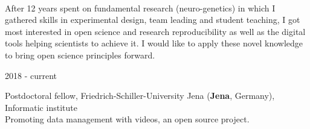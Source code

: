 \begin{minipage}[t]{\textwidth}
\begin{minipage}[b]{0.5\textwidth}
    \end{minipage}\hfill
    \begin{minipage}[b]{0.5\textwidth}
        \begin{flushright}
        \end{flushright}
    \end{minipage}
\end{minipage}\\

After 12 years spent on fundamental research (neuro-genetics) in which I gathered skills in experimental design, team leading and student teaching, I got most interested in open science and research reproducibility as well as the digital tools helping scientists to achieve it.
I would like to apply these novel knowledge %
to bring open science principles forward.

%
\parbox{0.15\textwidth}{2018 - current}\hfill
\parbox[t]{0.83\textwidth}{Postdoctoral fellow,
       Friedrich-Schiller-University Jena  (\textbf{Jena}, Germany),
       Informatic institute\\
       Promoting data management with videos, an open source project.}

